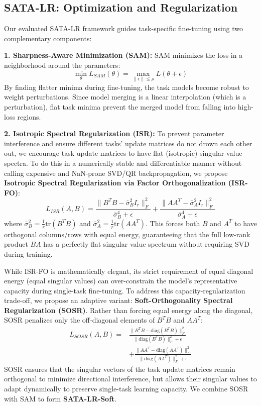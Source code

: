 \documentclass{article}
\begin{document}
\subsection{SATA-LR: Optimization and Regularization}
Our evaluated SATA-LR framework guides task-specific fine-tuning using two complementary components:

\textbf{1. Sharpness-Aware Minimization (SAM):}
SAM \cite{foret2020sharpness} minimizes the loss in a neighborhood around the parameters:
\begin{equation}
    \min_{\theta} L_{SAM}(\theta) = \max_{\|\epsilon\| \le \rho} L(\theta + \epsilon)
\end{equation}
By finding flatter minima during fine-tuning, the task models become robust to weight perturbations. Since model merging is a linear interpolation (which is a perturbation), flat task minima prevent the merged model from falling into high-loss regions.

\textbf{2. Isotropic Spectral Regularization (ISR):}
To prevent parameter interference and ensure different tasks' update matrices do not drown each other out, we encourage task update matrices to have flat (isotropic) singular value spectra. To do this in a numerically stable and differentiable manner without calling expensive and NaN-prone SVD/QR backpropagation, we propose \textbf{Isotropic Spectral Regularization via Factor Orthogonalization (ISR-FO)}:
\begin{equation}
    L_{ISR}(A, B) = \frac{\|B^T B - \bar{\sigma}_B^2 I_r\|_F^2}{\bar{\sigma}_B^4 + \epsilon} + \frac{\|A A^T - \bar{\sigma}_A^2 I_r\|_F^2}{\bar{\sigma}_A^4 + \epsilon}
\end{equation}
where $\bar{\sigma}_B^2 = \frac{1}{r} \text{tr}(B^T B)$ and $\bar{\sigma}_A^2 = \frac{1}{r} \text{tr}(A A^T)$. This forces both $B$ and $A^T$ to have orthogonal columns/rows with equal energy, guaranteeing that the full low-rank product $B A$ has a perfectly flat singular value spectrum without requiring SVD during training.

While ISR-FO is mathematically elegant, its strict requirement of equal diagonal energy (equal singular values) can over-constrain the model's representative capacity during single-task fine-tuning. To address this capacity-regularization trade-off, we propose an adaptive variant: \textbf{Soft-Orthogonality Spectral Regularization (SOSR)}. Rather than forcing equal energy along the diagonal, SOSR penalizes only the off-diagonal elements of $B^T B$ and $A A^T$:
\begin{equation}
\begin{split}
    L_{SOSR}(A, B) = &\frac{\|B^T B - \text{diag}(B^T B)\|_F^2}{\|\text{diag}(B^T B)\|_F^2 + \epsilon} \\
    &+ \frac{\|A A^T - \text{diag}(A A^T)\|_F^2}{\|\text{diag}(A A^T)\|_F^2 + \epsilon}
\end{split}
\end{equation}
SOSR ensures that the singular vectors of the task update matrices remain orthogonal to minimize directional interference, but allows their singular values to adapt dynamically to preserve single-task learning capacity. We combine SOSR with SAM to form \textbf{SATA-LR-Soft}.
\end{document}
